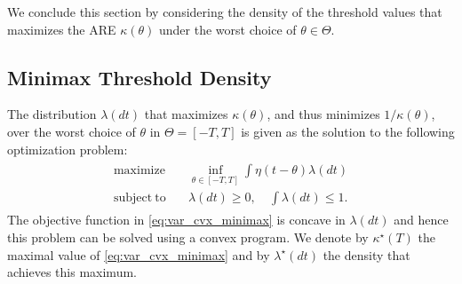 \documentclass[letterpaper, 11pt]{IEEEtran}      %
\newtheorem{rem}{\bf {Remark}}
\begin{document}
%
We conclude this section by considering the density of the threshold values that maximizes the ARE $\kappa(\theta)$ under the worst choice of $\theta \in \Theta$.

\subsection{Minimax Threshold Density}
The distribution $\lambda(dt)$ that maximizes $\kappa(\theta)$, and thus minimizes $1/\kappa(\theta)$, over the worst choice of $\theta$ in $\Theta = [-T,T]$ is given as the solution to the following optimization problem:
\begin{align}
\label{eq:var_cvx_minimax}
\begin{split}
\mathrm{maximize} \quad &  \inf_{\theta \in [-T,T]} \int \eta(t-\theta) \lambda(dt)
\\ 
\mathrm{subject~to} 
\quad & \lambda(dt)\geq 0,\quad \int \lambda(dt) \leq 1. 
\end{split}
\end{align}
The objective function in \eqref{eq:var_cvx_minimax} is concave in $\lambda(dt)$ and hence this problem can be solved using a convex program. We denote by $\kappa^\star(T)$ the maximal value of \eqref{eq:var_cvx_minimax} and by $\lambda^\star(dt)$ the density that achieves this maximum.  
%
\end{document}
